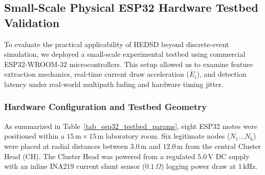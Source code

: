 \documentclass[conference]{IEEEtran}
\begin{document}
\begin{enumerate}
\subsection{Small-Scale Physical ESP32 Hardware Testbed Validation}
To evaluate the practical applicability of HEDSD beyond discrete-event simulation, we deployed a small-scale experimental testbed using commercial ESP32-WROOM-32 microcontrollers. This setup allowed us to examine feature extraction mechanics, real-time current draw acceleration ($\dot{E}_i$), and detection latency under real-world multipath fading and hardware timing jitter.

\begin{table}[htbp]
\caption{Physical ESP32 Testbed Operational Parameters}
\label{tab_esp32_testbed_params}
\centering
\small
\renewcommand{\arraystretch}{1.15}
\end{table}

\subsubsection{Hardware Configuration and Testbed Geometry}
As summarized in Table~\ref{tab_esp32_testbed_params}, eight ESP32 motes were positioned within a $15\,\text{m} \times 15\,\text{m}$ laboratory room. Six legitimate nodes ($N_1 \dots N_6$) were placed at radial distances between $3.0\,\text{m}$ and $12.0\,\text{m}$ from the central Cluster Head ($\text{CH}$). The Cluster Head was powered from a regulated $5.0\,\text{V}$ DC supply with an inline INA219 current shunt sensor ($0.1\,\Omega$) logging power draw at $1\,\text{kHz}$.


\end{enumerate}
\end{document}
